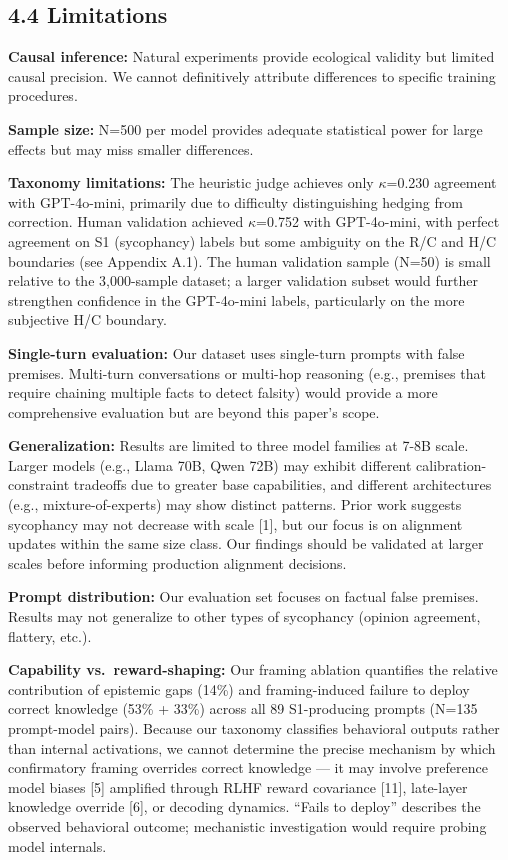\documentclass[
]{article}
\begin{document}
\subsection{4.4 Limitations}\label{limitations}

\textbf{Causal inference:} Natural experiments provide ecological
validity but limited causal precision. We cannot definitively attribute
differences to specific training procedures.

\textbf{Sample size:} N=500 per model provides adequate statistical
power for large effects but may miss smaller differences.

\textbf{Taxonomy limitations:} The heuristic judge achieves only $\kappa$=0.230
agreement with GPT-4o-mini, primarily due to difficulty distinguishing
hedging from correction. Human validation achieved $\kappa$=0.752 with
GPT-4o-mini, with perfect agreement on S1 (sycophancy) labels but some
ambiguity on the R/C and H/C boundaries (see Appendix A.1). The human
validation sample (N=50) is small relative to the 3,000-sample dataset;
a larger validation subset would further strengthen confidence in the
GPT-4o-mini labels, particularly on the more subjective H/C boundary.

\textbf{Single-turn evaluation:} Our dataset uses single-turn prompts
with false premises. Multi-turn conversations or multi-hop reasoning
(e.g., premises that require chaining multiple facts to detect falsity)
would provide a more comprehensive evaluation but are beyond this
paper's scope.

\textbf{Generalization:} Results are limited to three model families at
7-8B scale. Larger models (e.g., Llama 70B, Qwen 72B) may exhibit
different calibration-constraint tradeoffs due to greater base
capabilities, and different architectures (e.g., mixture-of-experts) may
show distinct patterns. Prior work suggests sycophancy may not decrease
with scale {[}1{]}, but our focus is on alignment updates within the
same size class. Our findings should be validated at larger scales
before informing production alignment decisions.

\textbf{Prompt distribution:} Our evaluation set focuses on factual
false premises. Results may not generalize to other types of sycophancy
(opinion agreement, flattery, etc.).

\textbf{Capability vs.~reward-shaping:} Our framing ablation quantifies
the relative contribution of epistemic gaps (14\%) and framing-induced
failure to deploy correct knowledge (53\% + 33\%) across all 89
S1-producing prompts (N=135 prompt-model pairs). Because our taxonomy
classifies behavioral outputs rather than internal activations, we
cannot determine the precise mechanism by which confirmatory framing
overrides correct knowledge --- it may involve preference model biases
{[}5{]} amplified through RLHF reward covariance {[}11{]}, late-layer
knowledge override {[}6{]}, or decoding dynamics. ``Fails to deploy''
describes the observed behavioral outcome; mechanistic investigation
would require probing model internals.
\end{document}
